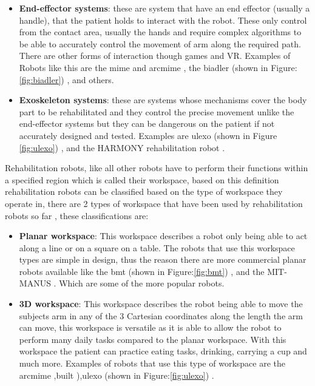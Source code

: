 \begin{itemize}%
	\item \textbf{End-effector systems}: these are system that have an end effector (usually a handle), that the patient holds to interact with the robot. These only control from the contact area, usually the hands and require complex algorithms to be able to accurately control the movement of arm along the required path. There are other forms of interaction though games and VR. Examples of Robots like this are the \ac{mime} and \ac{arcmime} \cite{Mahoney2003,OMalley2006}, the \ac{biadler} (shown in Figure: \ref{fig:biadler}) \cite{Lott2016,Johnson2011b}, and others.
	\item \textbf{Exoskeleton systems}: these are systems whose mechanisms  cover the body part to be rehabilitated and they control the precise movement unlike the end-effector systems but they can be dangerous on the patient if not accurately designed and tested. Examples are  \ac{ulexo} (shown in Figure \ref{fig:ulexo}) \cite{Kim2013,Simkins2016}, and the HARMONY rehabilitation robot \cite{Kim2017}.
\end{itemize}
Rehabilitation robots, like all other robots have to perform their functions within a specified region which is called their workspace, based on this definition rehabilitation robots can be classified based on the type of workspace they operate in, there are 2 types of workspace that have been used by rehabilitation robots so far \cite{Sheng2016}, these classifications are:
\begin{itemize}%
	\item \textbf{Planar workspace}: This workspace describes a robot only being able to act along a line or on a square on a table. The robots that use this workspace types are simple in design, thus the reason there are more commercial planar robots available like the \ac{bmt} (shown in Figure:\ref{fig:bmt}) \cite{Hesse2006,Hsieh2016,Schmidt2004}, and the MIT-MANUS \cite{Hesse2003,Hogan1992,Waldner2009}. Which are some of the more popular robots. 
	\item \textbf{3D workspace}: This workspace describes the robot being able to move the subjects arm in any of the 3 Cartesian coordinates along the length the arm can move, this workspace is versatile as it is able to allow the robot to perform many daily tasks compared to the planar workspace. With this workspace the patient can practice eating tasks, drinking, carrying a cup and much more. Examples of robots that use this type of workspace are the \ac{arcmime} \cite{Mahoney2003},\ac{built} \cite{Sampson2012a}),\ac{ulexo} (shown in Figure:\ref{fig:ulexo}) \cite{Shen2019a,Simkins2016}.
\end{itemize}
